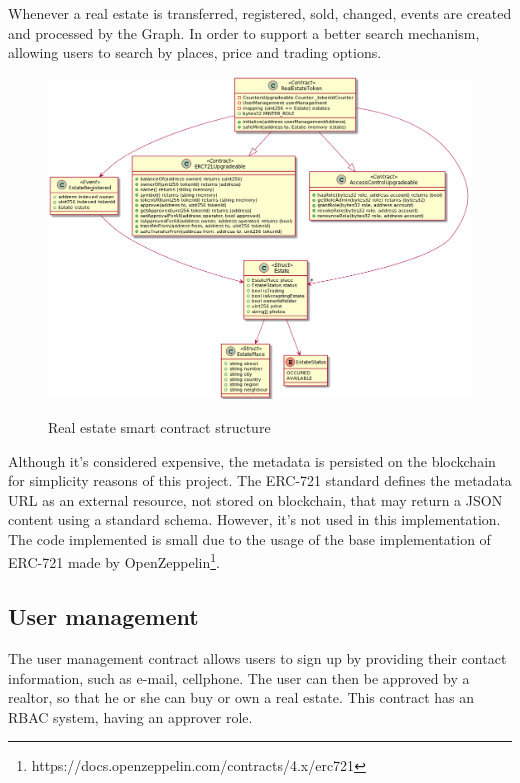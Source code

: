 \documentclass[
    article, 
    12pt,				%
	oneside,			%
	a4paper,			%
	chapter=TITLE,		%
	section=TITLE,		%
	english,			%
	english,				%
	sumario=tradicional
]{abntex2}
\begin{document}
Whenever a real estate is transferred, registered, sold, changed, events are created and processed by the Graph.
In order to support a better search mechanism, allowing users to search by places, price and trading options.

\begin{figure}[ht]
    \centering
    \caption{Real estate smart contract structure}
    \includegraphics[width=\textwidth]{images/uml/real_estate_token.png}
    \label{fig:real_estate_token_uml}
\end{figure}

Although it's considered expensive, the metadata is persisted on the blockchain for simplicity reasons of this project.
The ERC-721 standard defines the metadata URL as an external resource, not stored on blockchain, that may return a JSON content using a standard schema.
However, it's not used in this implementation.
The code implemented is small due to the usage of the base implementation of ERC-721 made by OpenZeppelin\footnote{https://docs.openzeppelin.com/contracts/4.x/erc721}.


\subsection{User management}

The user management contract allows users to sign up by providing their contact information, such as e-mail, cellphone.
The user can then be approved by a realtor, so that he or she can buy or own a real estate.
This contract has an RBAC system, having an approver role.
\end{document}
